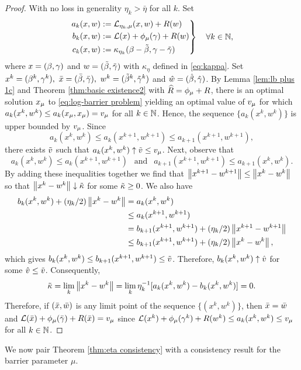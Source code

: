 \begin{proof}
With no loss in generality $\eta_k>\bar\eta$ for all $k$.
Set 
\[\left.\begin{aligned}
a_k(x,w)&:=\operatorname{\mathcal{L}}_{\eta_k,\mu}(x,w)+R(w)\\ 
b_k(x,w)&:=\operatorname{\mathcal{L}}(x)+\phi_\mu(\gamma)+R(w)\\
c_k(x,w)&:=\kappa_{\eta_k}(\beta-\tilde\beta,\gamma-{\tilde{\gamma}})
\end{aligned}\right\}\quad \forall k\in\operatorname{\mathbb{N}},
\] 
where 
$x=(\beta,\gamma)$ and $w=(\tilde\beta,{\tilde{\gamma}})$ with $\kappa_\eta$ defined in
\eqref{eq:kappa}. Set $x^k=(\beta^k,\gamma^k),\ {\bar x}=(\bar\beta,\bar{\gamma}),\ w^k=(\tilde\beta^k,{\tilde{\gamma}}^k)$ and ${\hat w}=(\hat\beta,\hat{\gamma})$.
By Lemma \ref{lem:lb plus 1c} and Theorem \ref{thm:basic existence2} 
with ${\widehat R}=\phi_\mu+R$, 
there is an optimal solution $x_\mu$ 
to \eqref{eq:log-barrier problem} %
yielding an optimal value of $v_\mu$ for which 
$a_k(x^k,w^k)\le a_k(x_\mu,x_\mu)=v_\mu$ for all $k\in\operatorname{\mathbb{N}}$. Hence, the sequence
$\{a_k(x^k,w^k)\}$ is upper bounded by $v_\mu$.
Since
\[
a_k(x^k,w^k)\le a_k(x^{k+1},w^{k+1})\le a_{k+1}(x^{k+1},w^{k+1}),
\]
there exists ${\tilde v}$ such that
$a_k(x^k,w^k)\uparrow{\tilde v}\le v_\mu$.
Next, observe that
\[
a_k(x^k,w^k) \le a_k(x^{k+1},w^{k+1})\ \ \text{ and }\ \ 
a_{k+1}(x^{k+1},w^{k+1})\le a_{k+1}(x^{k},w^{k}).
\]
By adding these inequalities together we find that 
$\left\Vert x^{k+1}-w^{k+1}\right\Vert\le \left\Vert x^{k}-w^{k}\right\Vert$ so that 
$\left\Vert x^{k}-w^{k}\right\Vert\downarrow{\tilde\kappa}$ for some ${\tilde\kappa}\ge 0$.
We also have
\[\begin{aligned}
b_k(x^k,w^k)+(\eta_k/2)\left\Vert x^{k}-w^{k}\right\Vert
&=a_k(x^k,w^k)
\\ &\le a_k(x^{k+1},w^{k+1})
\\ &=b_{k+1}(x^{k+1},w^{k+1})+(\eta_k/2)\left\Vert x^{k+1}-w^{k+1}\right\Vert
\\ &\le b_{k+1}(x^{k+1},w^{k+1})+(\eta_k/2)\left\Vert x^{k}-w^{k}\right\Vert,
\end{aligned}\]
which gives $b_k(x^k,w^k)\le b_{k+1}(x^{k+1},w^{k+1})\le {\tilde v}$.
Therefore, $b_k(x^k,w^k)\uparrow {\hat v}$ for some ${\hat v}\le{\tilde v}$.
Consequently,
\[
{\tilde\kappa}=\lim_k\left\Vert x^{k}-w^{k}\right\Vert=
\lim_k\eta_k^{-1}[a_k(x^k,w^k)-b_k(x^k,w^k)]=0.
\]
Therefore, if $({\bar x},{\bar w})$ is any limit point of the sequence $\{(x^k,w^k)\}$,
then ${\bar x}={\bar w}$ and $\operatorname{\mathcal{L}}({\bar x})+\phi_\mu({\bar{\gamma}})+R({\bar x})=v_\mu$ 
since $\operatorname{\mathcal{L}}(x^k)+\phi_\mu(\gamma^k)+R(w^k)\le a_k(x^k,w^k)\le v_\mu$
for all $k\in\operatorname{\mathbb{N}}$.
\end{proof}
We now pair Theorem \ref{thm:eta consistency} with a consistency result for the barrier parameter $\mu$.

